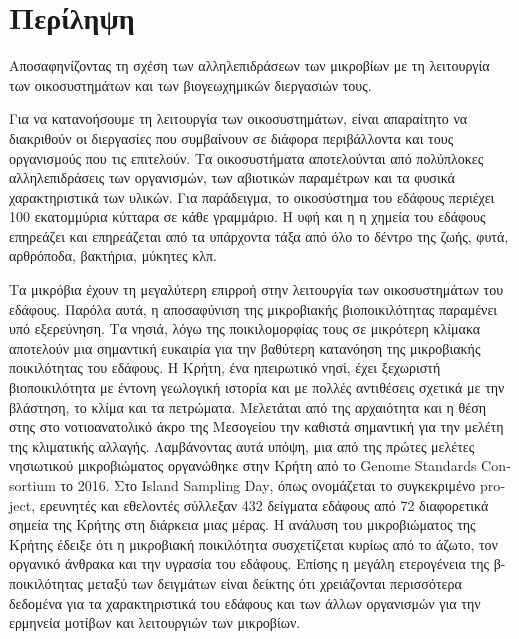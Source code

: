 \documentclass[11pt]{article}
\begin{document}
\section*{Περίληψη}
{\LARGE Αποσαφηνίζοντας τη σχέση των αλληλεπιδράσεων των μικροβίων με τη λειτουργία των οικοσυστημάτων και των βιογεωχημικών διεργασιών τους.}


\vspace{1cm}

Για να κατανοήσουμε τη λειτουργία των οικοσυστημάτων, είναι απαραίτητο να διακριθούν
οι διεργασίες που συμβαίνουν σε διάφορα περιβάλλοντα και τους οργανισμούς
που τις επιτελούν. Τα οικοσυστήματα αποτελούνται από πολύπλοκες αλληλεπιδράσεις των οργανισμών,
των αβιοτικών παραμέτρων και τα φυσικά χαρακτηριστικά των υλικών. Για παράδειγμα,
το οικοσύστημα του εδάφους περιέχει 100 εκατομμύρια κύτταρα σε κάθε γραμμάριο. Η υφή και η
η χημεία του εδάφους επηρεάζει και επηρεάζεται από τα υπάρχοντα τάξα από όλο το
δέντρο της ζωής, φυτά, αρθρόποδα, βακτήρια, μύκητες κλπ.

Τα μικρόβια έχουν τη μεγαλύτερη επιρροή στην λειτουργία των οικοσυστημάτων του εδάφους. 
Παρόλα αυτά, η αποσαφύνιση της μικροβιακής βιοποικιλότητας παραμένει υπό εξερεύνηση.
Τα νησιά, λόγω της ποικιλομορφίας τους σε μικρότερη κλίμακα αποτελούν μια σημαντική ευκαιρία για 
την βαθύτερη κατανόηση της μικροβιακής ποικιλότητας του εδάφους. 
Η Κρήτη, ένα ηπειρωτικό νησί, έχει ξεχωριστή βιοποικιλότητα με έντονη γεωλογική 
ιστορία και με πολλές αντιθέσεις σχετικά με την βλάστηση, το κλίμα και τα πετρώματα. 
Μελετάται από της αρχαιότητα και η θέση στης στο νοτιοανατολικό άκρο της Μεσογείου 
την καθιστά σημαντική για την μελέτη της κλιματικής αλλαγής.
Λαμβάνοντας αυτά υπόψη, μια από της πρώτες μελέτες νησιωτικού μικροβιώματος 
οργανώθηκε στην Κρήτη από το \textlatin{Genome Standards Consortium} το 2016. 
Στο \textlatin{Island Sampling Day}, όπως ονομάζεται το συγκεκριμένο \textlatin{project},
ερευνητές και εθελοντές σύλλεξαν 432 δείγματα εδάφους από 72 διαφορετικά σημεία της Κρήτης
στη διάρκεια μιας μέρας.
Η ανάλυση του μικροβιώματος της Κρήτης έδειξε ότι η μικροβιακή ποικιλότητα
συσχετίζεται κυρίως από το άζωτο, τον οργανικό άνθρακα και την υγρασία του εδάφους.
Επίσης η μεγάλη ετερογένεια της β-ποικιλότητας μεταξύ των δειγμάτων είναι δείκτης ότι χρειάζονται περισσότερα 
δεδομένα για τα χαρακτηριστικά του εδάφους και των άλλων οργανισμών για την ερμηνεία μοτίβων και λειτουργιών 
των μικροβίων.
\end{document}
